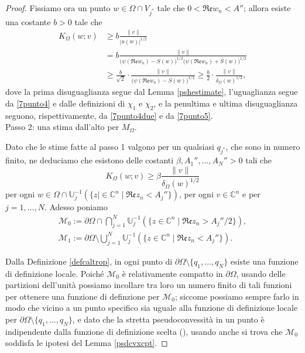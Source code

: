 \begin{proof}
    Fissiamo ora un punto $w\in\Omega\cap V_{j^*}$ tale che $0<\mathfrak{Re}w_n<A''$; allora esiste una costante $b>0$ tale che
    \begin{equation}\label{7punto6}
        \begin{aligned}
            K_\Omega(w;v)&\ge b\frac{\|v\|}{|u(w)|^{1/2}}\\
            &=b\frac{\|v\|}{\big(\psi(\mathfrak{Re}w_n)-S(w)\big)^{1/2}\big(\psi(\mathfrak{Re}w_n)+S(w)\big)^{1/2}}\\
            &\ge\frac{b}{\sqrt{2}}\cdot\frac{\|v\|}{\big(\psi(\mathfrak{Re}w_n)-S(w)\big)^{1/2}} \ge \frac{b}{2}\cdot\frac{\|v\|}{\delta_\Omega(w)^{1/2}},
        \end{aligned}
    \end{equation}
    dove la prima disuguaglianza segue dal Lemma \ref{pshestimate}, l'uguaglianza segue da \eqref{7punto4} e dalle definizioni di $\chi_1$ e $\chi_2$, e la penultima e ultima disuguaglianza seguono, rispettivamente, da \eqref{7punto4due} e da \eqref{7punto5}.\\

    Passo 2: una stima dall'alto per $M_\Omega$.

    Dato che le stime fatte al passo 1 valgono per un qualsiasi $q_{j^*}$, che sono in numero finito, ne deduciamo che esistono delle costanti $\beta,A_1'',\dots,A_N''>0$ tali che
    \begin{equation}\label{7punto7}
        K_\Omega(w;v)\ge\beta\frac{\|v\|}{\delta_\Omega(w)^{1/2}}
    \end{equation}
    per ogni $w\in\Omega\cap\mathbb{U}_j^{-1}(\{z\mid\in\mathbb{C}^n\mid \mathfrak{Re}z_n<A_j''\})$, per ogni $v\in\mathbb{C}^n$ e per $j=1,\dots,N$. Adesso poniamo
    \begin{gather*}
        \mathcal{M}_0:=\partial\Omega\cap\bigcap_{j=1}^N \mathbb{U}_j^{-1}(\{z\in\mathbb{C}^n\mid \mathfrak{Re}z_n>A_j''/2\}),\\
        \mathcal{M}_1:=\partial\Omega\setminus\bigcup_{j=1}^N \mathbb{U}_j^{-1}(\{z\in\mathbb{C}^n\mid \mathfrak{Re}z_n<A_j''\}).
    \end{gather*}
    
    Dalla Definizione \ref{defcaltrop}, in ogni punto di $\partial\Omega\setminus\{q_1,\dots,q_N\}$ esiste una funzione di definizione locale. Poiché $\mathcal{M}_0$ è relativamente compatto in $\partial\Omega$, usando delle partizioni dell'unità possiamo incollare tra loro un numero finito di tali funzioni per ottenere una funzione di definzione per $\mathcal{M}_0$; siccome possiamo sempre farlo in modo che vicino a un punto specifico sia uguale alla funzione di definizione locale per $\partial\Omega\setminus\{q_1,\dots,q_N\}$, e dato che la stretta pseudoconvessità in un punto è indipendente dalla funzione di definizione scelta (\cite[Section 3.2]{Kr}), usando anche \cite[Proposition 3.2.1]{Kr} si trova che $\mathcal{M}_0$ soddisfa le ipotesi del Lemma \ref{psdcvxcpt}.


\end{proof}
